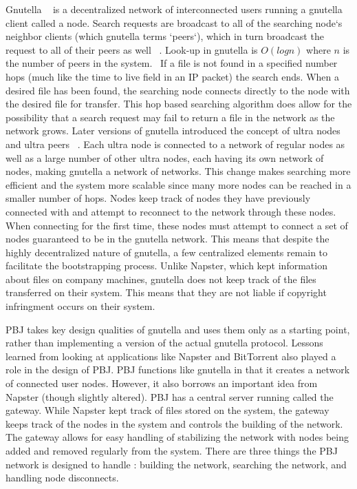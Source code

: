 \documentclass{acm_proc_article-sp}
\begin{document}
Gnutella ~\cite{gnut} is a decentralized network of interconnected users running a gnutella client called a node.  Search requests are broadcast to all of the searching node`s neighbor clients (which gnutella terms `peers`), which in turn broadcast the request to all of their peers as well ~\cite{lookup}. Look-up in gnutella is $O(log n)$ where $n$ is the number of peers in the system.~\cite{superpeer} If a file is not found in a specified number hops (much like the time to live field in an IP packet) the search ends. When a desired file has been found, the searching node connects directly to the node with the desired file for transfer. This hop based searching algorithm does allow for the possibility that a search request may fail to return a file in the network as the network grows.  Later versions of gnutella introduced the concept of ultra nodes and ultra peers ~\cite{evo}. Each ultra node is connected to a network of regular nodes as well as a large number of other ultra nodes, each having its own network of nodes, making gnutella a network of networks.  This change makes searching more efficient and the system more scalable since many more nodes can be reached in a smaller number of hops. Nodes keep track of nodes they have previously connected with and attempt to reconnect to the network through these nodes.  When connecting for the first time, these nodes must attempt to connect a set of nodes guaranteed to be in the gnutella network.  This means that despite the highly decentralized nature of gnutella, a few centralized elements remain to facilitate the bootstrapping process.  Unlike Napster, which kept information about files on company machines, gnutella does not keep track of the files transferred on their system.  This means that they are not liable if copyright infringment occurs on their system.         


PBJ takes key design qualities of gnutella and uses them only as a starting point, rather than implementing a version of the actual gnutella protocol. Lessons learned from looking at applications like Napster and BitTorrent also played a role in the design of PBJ.  PBJ functions like gnutella in that it creates a network of connected user nodes.  However, it also borrows an important idea from Napster (though slightly altered).  PBJ has a central server running called the gateway.  While Napster kept track of files stored on the system, the gateway keeps track of the nodes in the system and controls the building of the network.  The gateway allows for easy handling of stabilizing the network with nodes being added and removed regularly from the system.  There are three things the PBJ network is designed to handle : building the network, searching the network, and handling node disconnects.
\end{document}
